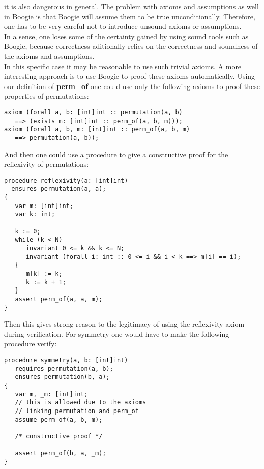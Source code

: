 \documentclass{report}
\begin{document}
it is also dangerous in general. The problem with axioms and assumptions as well
in Boogie is that Boogie will assume them to be true unconditionally. Therefore,
one has to be very careful not to introduce unsound axioms or assumptions.\\
In a sense, one loses some of the certainty gained by using sound tools such as
Boogie, because correctness aditionally relies on the correctness and soundness
of the axioms and assumptions.\\
In this specific case it may be reasonable to use such trivial axioms. A more
interesting approach is to use Boogie to proof these axioms automatically. Using our
definition of \textbf{perm\_of} one could use only the following axioms to
proof these properties of permutations:
\begin{lstlisting}
axiom (forall a, b: [int]int :: permutation(a, b)
   ==> (exists m: [int]int :: perm_of(a, b, m)));
axiom (forall a, b, m: [int]int :: perm_of(a, b, m)
   ==> permutation(a, b));
\end{lstlisting}

And then one could use a procedure to give a constructive proof for the
reflexivity of permutations:
\begin{lstlisting}
procedure reflexivity(a: [int]int)
  ensures permutation(a, a);
{
   var m: [int]int;
   var k: int;

   k := 0;
   while (k < N)
      invariant 0 <= k && k <= N;
      invariant (forall i: int :: 0 <= i && i < k ==> m[i] == i);
   {
      m[k] := k;
      k := k + 1;
   }
   assert perm_of(a, a, m);
}
\end{lstlisting}

Then this gives strong reason to the legitimacy of using the reflexivity axiom
during verification. For symmetry one would have to make the following procedure
verify:
\begin{lstlisting}
procedure symmetry(a, b: [int]int)
   requires permutation(a, b);
   ensures permutation(b, a);
{
   var m, _m: [int]int;
   // this is allowed due to the axioms
   // linking permutation and perm_of
   assume perm_of(a, b, m);
                 
   /* constructive proof */
                     
   assert perm_of(b, a, _m);
}
\end{lstlisting}
\end{document}
